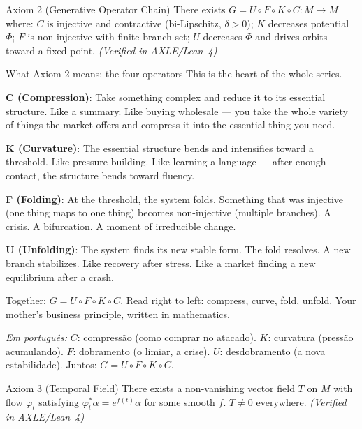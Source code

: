 \documentclass[12pt, openright]{book}
\theoremstyle{definition}
\theoremstyle{remark}
\begin{document}
\begin{formalbox}{Axiom 2 (Generative Operator Chain)}
There exists $G = U \circ F \circ K \circ C : M \to M$ where:
$C$ is injective and contractive (bi-Lipschitz, $\delta > 0$);
$K$ decreases potential $\Phi$;
$F$ is non-injective with finite branch set;
$U$ decreases $\Phi$ and drives orbits toward a fixed point.
\hfill\textit{(Verified in AXLE/Lean~4)}
\end{formalbox}

\begin{studentbox}{What Axiom 2 means: the four operators}
This is the heart of the whole series.

\textbf{C (Compression)}: Take something complex and reduce it
to its essential structure. Like a summary. Like buying wholesale ---
you take the whole variety of things the market offers and compress
it into the essential thing you need.

\textbf{K (Curvature)}: The essential structure bends and intensifies
toward a threshold. Like pressure building. Like learning a language ---
after enough contact, the structure bends toward fluency.

\textbf{F (Folding)}: At the threshold, the system folds. Something
that was injective (one thing maps to one thing) becomes non-injective
(multiple branches). A crisis. A bifurcation. A moment of irreducible
change.

\textbf{U (Unfolding)}: The system finds its new stable form.
The fold resolves. A new branch stabilizes. Like recovery after stress.
Like a market finding a new equilibrium after a crash.

Together: $G = U \circ F \circ K \circ C$.
Read right to left: compress, curve, fold, unfold.
Your mother's business principle, written in mathematics.

\textit{Em português:}
$C$: compressão (como comprar no atacado).
$K$: curvatura (pressão acumulando).
$F$: dobramento (o limiar, a crise).
$U$: desdobramento (a nova estabilidade).
Juntos: $G = U \circ F \circ K \circ C$.
\end{studentbox}

\begin{formalbox}{Axiom 3 (Temporal Field)}
There exists a non-vanishing vector field $T$ on $M$ with flow
$\varphi_t$ satisfying $\varphi_t^* \alpha = e^{f(t)} \alpha$
for some smooth $f$. $T \neq 0$ everywhere.
\hfill\textit{(Verified in AXLE/Lean~4)}
\end{formalbox}
\end{document}
